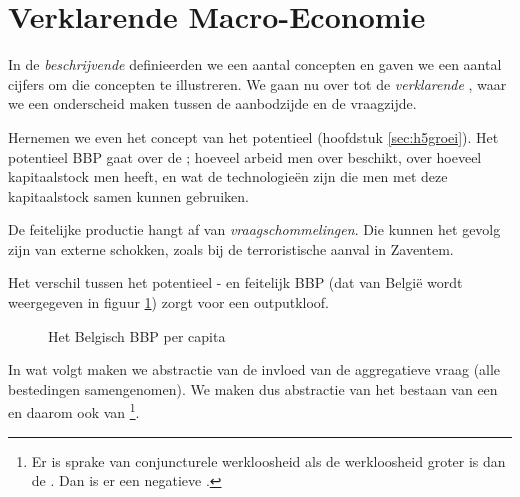 \section{Verklarende Macro-Economie}

In de \textit{beschrijvende}  definieerden we een aantal concepten en gaven we een aantal cijfers om die concepten te illustreren. We gaan nu over tot de \textit{verklarende} , waar we een onderscheid maken tussen de aanbodzijde en de vraagzijde.\\

\par Hernemen we even het concept van het potentieel  (hoofdstuk \ref{sec:h5groei}). Het potentieel BBP gaat over de  ; hoeveel arbeid men over beschikt, over hoeveel kapitaalstock men heeft, en wat de technologie\"en zijn die men met deze kapitaalstock samen kunnen gebruiken.
\par De feitelijke productie hangt af van \textit{vraagschommelingen}. Die kunnen het gevolg zijn van externe schokken, zoals bij de terroristische aanval in Zaventem.
\par Het verschil tussen het potentieel - en feitelijk BBP (dat van Belgi\"e wordt weergegeven in figuur \ref{fig:h6bbpbelgie}) zorgt voor een outputkloof.\\

\begin{figure}[H]
\small\centering\captionsetup{justification=centering,margin=2cm}
\caption{Het Belgisch BBP per capita}
\label{fig:h6bbpbelgie}
\end{figure}

\par In wat volgt maken we abstractie van de invloed van de aggregatieve vraag (alle bestedingen samengenomen). We maken dus abstractie van het bestaan van een  en daarom ook van \footnote{Er is sprake van conjuncturele werkloosheid als de werkloosheid groter is dan de . Dan is er een negatieve .}.\\

